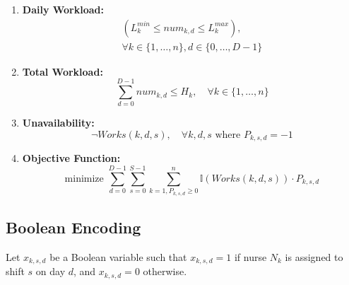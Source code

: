 \documentclass[sigconf, 10pt]{acmart}
\begin{document}
\begin{enumerate}
    \item \textbf{Daily Workload:}
    \begin{equation}
    \begin{gathered}
        (L_{k}^{min} \le num_{k,d} \le L_{k}^{max}), \\
        \forall k \in \{1, \dots, n\}, d \in \{0, \dots, D-1\}
    \end{gathered}
    \end{equation}

    \item \textbf{Total Workload:}
    \begin{equation}
        \sum_{d=0}^{D-1} num_{k,d} \le H_k, \quad \forall k \in \{1, \dots, n\}
    \end{equation}

    \item \textbf{Unavailability:}
    \begin{equation}
        \neg Works(k, d, s), \quad \forall k, d, s \text { where } P_{k,s,d} = -1
    \end{equation}

    \item \textbf{Objective Function:}
    \begin{equation}
        \text{minimize } \sum_{d=0}^{D-1} \sum_{s=0}^{S-1} \sum_{k=1, P_{k,s,d} \ge 0}^{n} \mathbb{I}(Works(k, d, s)) \cdot P_{k,s,d}
    \end{equation}
\end{enumerate}

\subsection{Boolean Encoding}

Let $x_{k,s,d}$ be a Boolean variable such that $x_{k,s,d} = 1$ if nurse $N_k$ is assigned to shift $s$ on day $d$, and $x_{k,s,d} = 0$ otherwise.
\end{document}
